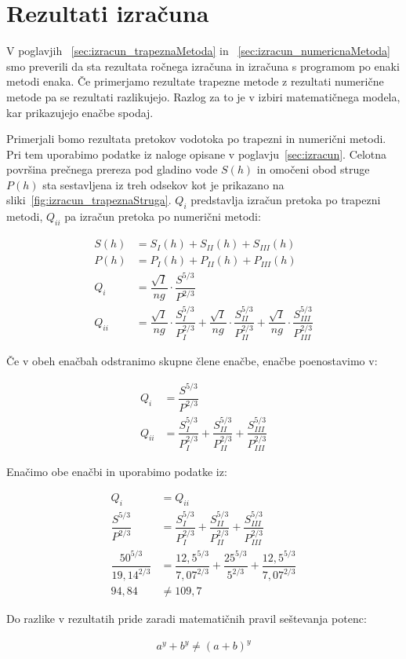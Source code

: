 \section{Rezultati izračuna}
V poglavjih ~\ref{sec:izracun_trapeznaMetoda} in ~\ref{sec:izracun_numericnaMetoda} smo preverili da sta rezultata ročnega izračuna in izračuna s programom po enaki metodi enaka. Če primerjamo rezultate trapezne metode z rezultati numerične metode pa se rezultati razlikujejo. Razlog za to je v izbiri matematičnega modela, kar prikazujejo enačbe spodaj.

Primerjali bomo rezultata pretokov vodotoka po trapezni in numerični metodi. Pri tem uporabimo podatke iz naloge opisane v poglavju~\ref{sec:izracun}. Celotna površina prečnega prereza pod gladino vode $S(h)$ in omočeni obod struge $P(h)$ sta sestavljena iz treh odsekov kot je prikazano na sliki~\ref{fig:izracun_trapeznaStruga}. $Q_i$ predstavlja izračun pretoka po trapezni metodi, $Q_{ii}$ pa izračun pretoka po numerični metodi:
\begin{ceqn}
\begin{align}
S(h)&= S_I(h) + S_{II}(h) + S_{III}(h)\\
P(h)&= P_I(h) + P_{II}(h) + P_{III}(h)\\
Q_i &= \dfrac{\sqrt{I}}{ng} \cdot \dfrac{S^{5/3}}{P^{2/3}} \\
Q_{ii} &= \dfrac{\sqrt{I}}{ng} \cdot \dfrac{S_I^{5/3}}{P_I^{2/3}} + \dfrac{\sqrt{I}}{ng} \cdot \dfrac{S_{II}^{5/3}}{P_{II}^{2/3}} + \dfrac{\sqrt{I}}{ng} \cdot \dfrac{S_{III}^{5/3}}{P_{III}^{2/3}}
\end{align}
\end{ceqn}

Če v obeh enačbah odstranimo skupne člene enačbe, enačbe poenostavimo v:

\begin{ceqn}
\begin{align}
Q_i &=\dfrac{S^{5/3}}{P^{2/3}}\\
Q_{ii} &= \dfrac{S_I^{5/3}}{P_I^{2/3}} + \dfrac{S_{II}^{5/3}}{P_{II}^{2/3}} + \dfrac{S_{III}^{5/3}}{P_{III}^{2/3}}
\end{align}
\end{ceqn}


Enačimo obe enačbi in uporabimo podatke iz:
\begin{ceqn}
\begin{align}
Q_i &= Q_{ii}\\
\dfrac{S^{5/3}}{P^{2/3}} &= \dfrac{S_I^{5/3}}{P_I^{2/3}} + \dfrac{S_{II}^{5/3}}{P_{II}^{2/3}} + \dfrac{S_{III}^{5/3}}{P_{III}^{2/3}}\\
\dfrac{50^{5/3}}{19,14^{2/3}} &= \dfrac{12,5^{5/3}}{7,07^{2/3}} + \dfrac{25^{5/3}}{5^{2/3}} + \dfrac{12,5^{5/3}}{7,07^{2/3}}\\
94,84 &\neq 109,7
\end{align}
\end{ceqn}


Do razlike v rezultatih pride zaradi matematičnih pravil seštevanja potenc:
\begin{ceqn}
\begin{align}
a^y + b^y \neq (a+b)^y
\end{align}
\end{ceqn}



